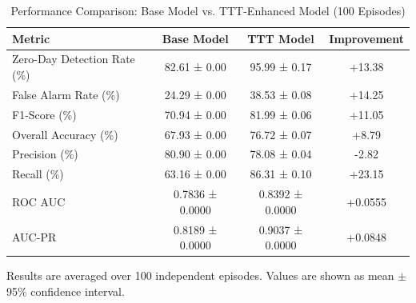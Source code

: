 \begin{table}[htbp]
\centering
\caption{Performance Comparison: Base Model vs. TTT-Enhanced Model (100 Episodes)}
\label{tab:performance}
\begin{tabular}{lccc}
\hline
Metric & Base Model & TTT Model & Improvement \\
\hline
Zero-Day Detection Rate (\%) & 82.61 ± 0.00 & 95.99 ± 0.17 & +13.38 \\
False Alarm Rate (\%) & 24.29 ± 0.00 & 38.53 ± 0.08 & +14.25 \\
F1-Score (\%) & 70.94 ± 0.00 & 81.99 ± 0.06 & +11.05 \\
Overall Accuracy (\%) & 67.93 ± 0.00 & 76.72 ± 0.07 & +8.79 \\
Precision (\%) & 80.90 ± 0.00 & 78.08 ± 0.04 & -2.82 \\
Recall (\%) & 63.16 ± 0.00 & 86.31 ± 0.10 & +23.15 \\
ROC AUC & 0.7836 ± 0.0000 & 0.8392 ± 0.0000 & +0.0555 \\
AUC-PR & 0.8189 ± 0.0000 & 0.9037 ± 0.0000 & +0.0848 \\
\hline
\end{tabular}
\begin{tablenotes}
\small
\item Results are averaged over 100 independent episodes. Values are shown as mean $\pm$ 95\% confidence interval.
\end{tablenotes}
\end{table}
